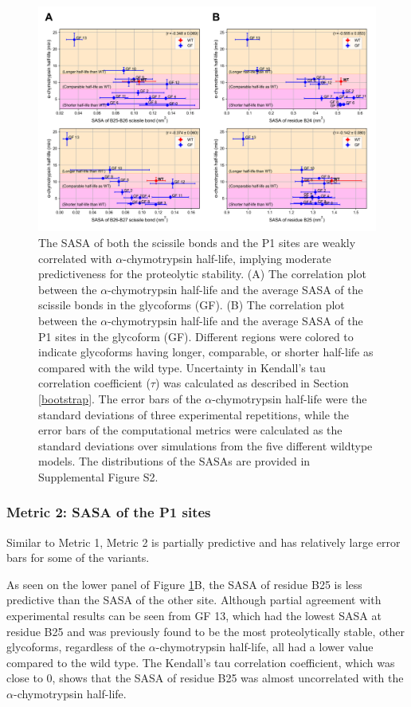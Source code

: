 \documentclass[sn-vancouver]{sn-jnl}
\begin{document}
\begin{figure}[H]
\centering
\includegraphics[width=\textwidth]{Figures/Fig_SASA_correlation.png}
\caption{The SASA of both the scissile bonds and the P1 sites are weakly correlated with $\alpha$-chymotrypsin half-life, implying moderate predictiveness for the proteolytic stability. (A) The correlation plot between the $\alpha$-chymotrypsin half-life and the average SASA of the scissile bonds in the glycoforms (GF). (B) The correlation plot between the $\alpha$-chymotrypsin half-life and the average SASA of the P1 sites in the glycoform (GF). Different regions were colored to indicate glycoforms having longer, comparable, or shorter half-life as compared with the wild type. Uncertainty in Kendall's tau correlation coefficient ($\tau$) was calculated as described in Section \ref{bootstrap}. The error bars of the $\alpha$-chymotrypsin half-life were the standard deviations of three experimental repetitions, while the error bars of the computational metrics were calculated as the standard deviations over simulations from the five different wildtype models. The distributions of the SASAs are provided in Supplemental Figure S2.}
\label{result_sasa}
\end{figure}

\subsubsection*{Metric 2: SASA of the P1 sites}
Similar to Metric 1, Metric 2 is partially predictive and has relatively large error bars for some of the variants. 

As seen on the lower panel of Figure \ref{result_sasa}B, the SASA of residue B25 is less predictive than the SASA of the other site. Although partial agreement with experimental results can be seen from GF 13, which had the lowest SASA at residue B25 and was previously found to be the most proteolytically stable, other glycoforms, regardless of the $\alpha$-chymotrypsin half-life, all had a lower value compared to the wild type. The Kendall's tau correlation coefficient, which was close to 0, shows that the SASA of residue B25 was almost uncorrelated with the $\alpha$-chymotrypsin half-life. 
\end{document}
